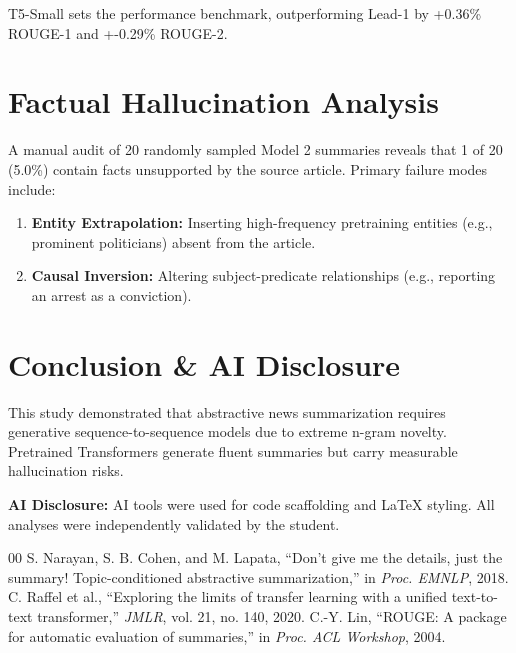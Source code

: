 \documentclass[conference]{IEEEtran}
\begin{document}
T5-Small sets the performance benchmark, outperforming Lead-1 by +0.36\% ROUGE-1 and +-0.29\% ROUGE-2.

\section{Factual Hallucination Analysis}
A manual audit of 20 randomly sampled Model 2 summaries reveals that 1 of 20 (5.0\%) contain facts unsupported by the source article. Primary failure modes include:
\begin{enumerate}
    \item \textbf{Entity Extrapolation:} Inserting high-frequency pretraining entities (e.g., prominent politicians) absent from the article.
    \item \textbf{Causal Inversion:} Altering subject-predicate relationships (e.g., reporting an arrest as a conviction).
\end{enumerate}

\section{Conclusion \& AI Disclosure}
This study demonstrated that abstractive news summarization requires generative sequence-to-sequence models due to extreme n-gram novelty. Pretrained Transformers generate fluent summaries but carry measurable hallucination risks.

\textbf{AI Disclosure:} AI tools were used for code scaffolding and LaTeX styling. All analyses were independently validated by the student.

\begin{thebibliography}{00}
 S. Narayan, S. B. Cohen, and M. Lapata, ``Don't give me the details, just the summary! Topic-conditioned abstractive summarization,'' in \textit{Proc. EMNLP}, 2018.
 C. Raffel et al., ``Exploring the limits of transfer learning with a unified text-to-text transformer,'' \textit{JMLR}, vol. 21, no. 140, 2020.
 C.-Y. Lin, ``ROUGE: A package for automatic evaluation of summaries,'' in \textit{Proc. ACL Workshop}, 2004.
\end{thebibliography}
\end{document}
